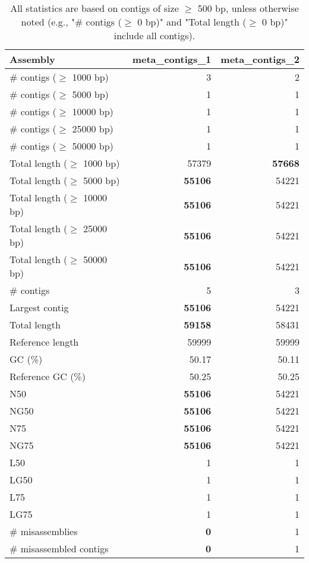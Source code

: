 \documentclass[12pt,a4paper]{article}
\begin{document}
\begin{table}[ht]
\begin{center}
\caption{All statistics are based on contigs of size $\geq$ 500 bp, unless otherwise noted (e.g., "\# contigs ($\geq$ 0 bp)" and "Total length ($\geq$ 0 bp)" include all contigs).}
\begin{tabular}{|l*{2}{|r}|}
\hline
Assembly & meta\_contigs\_1 & meta\_contigs\_2 \\ \hline
\# contigs ($\geq$ 1000 bp) & 3 & 2 \\ \hline
\# contigs ($\geq$ 5000 bp) & 1 & 1 \\ \hline
\# contigs ($\geq$ 10000 bp) & 1 & 1 \\ \hline
\# contigs ($\geq$ 25000 bp) & 1 & 1 \\ \hline
\# contigs ($\geq$ 50000 bp) & 1 & 1 \\ \hline
Total length ($\geq$ 1000 bp) & 57379 & {\bf 57668} \\ \hline
Total length ($\geq$ 5000 bp) & {\bf 55106} & 54221 \\ \hline
Total length ($\geq$ 10000 bp) & {\bf 55106} & 54221 \\ \hline
Total length ($\geq$ 25000 bp) & {\bf 55106} & 54221 \\ \hline
Total length ($\geq$ 50000 bp) & {\bf 55106} & 54221 \\ \hline
\# contigs & 5 & 3 \\ \hline
Largest contig & {\bf 55106} & 54221 \\ \hline
Total length & {\bf 59158} & 58431 \\ \hline
Reference length & 59999 & 59999 \\ \hline
GC (\%) & 50.17 & 50.11 \\ \hline
Reference GC (\%) & 50.25 & 50.25 \\ \hline
N50 & {\bf 55106} & 54221 \\ \hline
NG50 & {\bf 55106} & 54221 \\ \hline
N75 & {\bf 55106} & 54221 \\ \hline
NG75 & {\bf 55106} & 54221 \\ \hline
L50 & 1 & 1 \\ \hline
LG50 & 1 & 1 \\ \hline
L75 & 1 & 1 \\ \hline
LG75 & 1 & 1 \\ \hline
\# misassemblies & {\bf 0} & 1 \\ \hline
\# misassembled contigs & {\bf 0} & 1 \\ \hline

\end{tabular}
\end{center}
\end{table}
\end{document}
